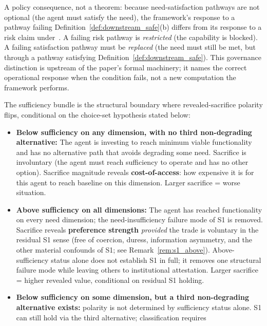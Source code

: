 \begin{remark}
A policy consequence, not a theorem: because need-satisfaction
pathways are not optional (the agent must satisfy the need), the
framework's response to a pathway failing
Definition~\ref{def:downstream_safe}(b) differs from its response
to a risk claim under~\citep[Controlled~Relaxation]{lasser2026wamura}.  A failing risk
pathway is \emph{restricted} (the capability is blocked).  A
failing satisfaction pathway must be \emph{replaced} (the need
must still be met, but through a pathway satisfying
Definition~\ref{def:downstream_safe}).  This governance
distinction is upstream of the paper's formal machinery; it names
the correct operational response when the condition fails, not a
new computation the framework performs.
\end{remark}

\begin{definition}
\label{def:polarity_boundary}
The sufficiency bundle is the structural boundary where
revealed-sacrifice polarity flips, conditional on the
choice-set hypothesis stated below:
\begin{itemize}
\item \textbf{Below sufficiency on any dimension, with no
  third non-degrading alternative:} The agent is
  investing to reach minimum viable functionality and has no
  alternative path that avoids degrading some need.  Sacrifice
  is involuntary (the agent must reach sufficiency to operate
  and has no other option).  Sacrifice magnitude reveals
  \textbf{cost-of-access}: how expensive it is for this agent
  to reach baseline on this dimension.  Larger sacrifice =
  worse situation.
\item \textbf{Above sufficiency on all dimensions:} The agent
  has reached functionality on every need dimension; the
  need-insufficiency failure mode of S1 is removed.  Sacrifice
  reveals \textbf{preference strength} \emph{provided} the
  trade is voluntary in the residual S1 sense (free of
  coercion, duress, information asymmetry, and the other
  material confounds of S1; see Remark~\ref{rem:s1_above}).
  Above-sufficiency status alone does not establish S1 in
  full; it removes one structural failure mode while leaving
  others to institutional attestation.  Larger sacrifice =
  higher revealed value, conditional on residual S1 holding.
\item \textbf{Below sufficiency on some dimension, but a
  third non-degrading alternative exists:} polarity is not
  determined by sufficiency status alone.  S1 can still hold
  via the third alternative; classification requires

\end{itemize}
\end{definition}
